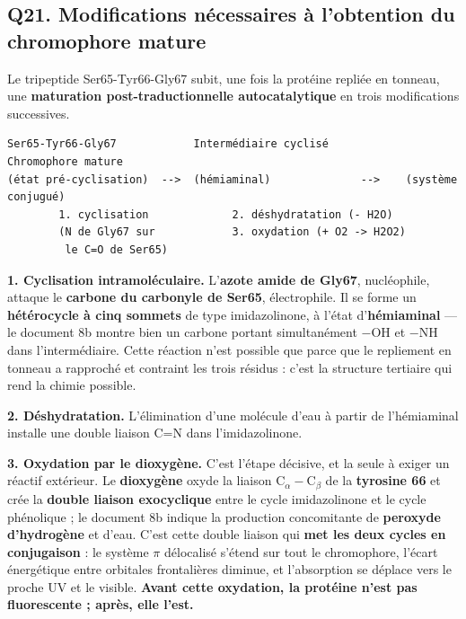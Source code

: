 \documentclass[11pt,a4paper]{article}
\begin{document}
\hypertarget{q21.-modifications-nuxe9cessaires-uxe0-lobtention-du-chromophore-mature}{%
\subsection{Q21. Modifications nécessaires à l'obtention du chromophore mature}\label{q21.-modifications-nuxe9cessaires-uxe0-lobtention-du-chromophore-mature}}

Le tripeptide Ser65-Tyr66-Gly67 subit, une fois la protéine repliée en tonneau, une \textbf{maturation post-traductionnelle autocatalytique} en trois modifications successives.

\begin{lstlisting}
Ser65-Tyr66-Gly67            Intermédiaire cyclisé            Chromophore mature
(état pré-cyclisation)  -->  (hémiaminal)              -->    (système conjugué)
        1. cyclisation             2. déshydratation (- H2O)
        (N de Gly67 sur            3. oxydation (+ O2 -> H2O2)
         le C=O de Ser65)
\end{lstlisting}

\textbf{1. Cyclisation intramoléculaire.} L'\textbf{azote amide de Gly67}, nucléophile, attaque le \textbf{carbone du carbonyle de Ser65}, électrophile. Il se forme un \textbf{hétérocycle à cinq sommets} de type imidazolinone, à l'état d'\textbf{hémiaminal} --- le document 8b montre bien un carbone portant simultanément \(-\)OH et \(-\)NH dans l'intermédiaire. Cette réaction n'est possible que parce que le repliement en tonneau a rapproché et contraint les trois résidus : c'est la structure tertiaire qui rend la chimie possible.

\textbf{2. Déshydratation.} L'élimination d'une molécule d'eau à partir de l'hémiaminal installe une double liaison C=N dans l'imidazolinone.

\textbf{3. Oxydation par le dioxygène.} C'est l'étape décisive, et la seule à exiger un réactif extérieur. Le \textbf{dioxygène} oxyde la liaison \({\mathrm{C}}_\alpha-{\mathrm{C}}_\beta\) de la \textbf{tyrosine 66} et crée la \textbf{double liaison exocyclique} entre le cycle imidazolinone et le cycle phénolique ; le document 8b indique la production concomitante de \textbf{peroxyde d'hydrogène} et d'eau. C'est cette double liaison qui \textbf{met les deux cycles en conjugaison} : le système \(\pi\) délocalisé s'étend sur tout le chromophore, l'écart énergétique entre orbitales frontalières diminue, et l'absorption se déplace vers le proche UV et le visible. \textbf{Avant cette oxydation, la protéine n'est pas fluorescente ; après, elle l'est.}
\end{document}
